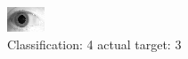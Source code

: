 \begin{figure}[h!]
\begin{center}
\includegraphics[width=0.60\columnwidth]{figures/ID1896_class_4_target_3.png}
\end{center}
\caption{ Classification: 4 actual target: 3}
\label{fig:ID1896_class_4_target_3}
\end{figure}
